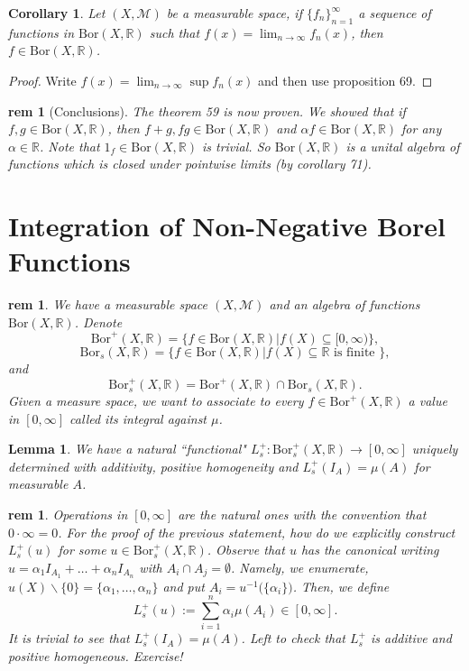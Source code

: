 \documentclass[letterpaper, 12pt]{article}
\newcommand{\fin}{\qquad \quad \hfill \framebox[1.75mm][l]{\,}}
\newcommand{\cM}{\mathcal{M}}
\newcommand{\bR}{\mathbb{R}}
\theoremstyle{stdthm}
\newtheorem{lem}[thm]{Lemma}
\newtheorem{cor}[thm]{Corollary}
\theoremstyle{stddef}
\newtheorem{rem}[thm]{rem} %
\theoremstyle{stdnonum}
\theoremstyle{stdqands}
\theoremstyle{stdbold}
\begin{document}
\begin{cor}
Let $(X,\cM)$ be a measurable space, if $\{f_n\}_{n=1}^\infty$ a sequence of functions in $\mathrm{Bor}(X,\bR)$ such that $f(x) = \lim_{n\rightarrow \infty} f_n(x)$, then $f \in \mathrm{Bor}(X,\bR)$.  
\end{cor}

\begin{proof}
Write $f(x) = \lim_{n\rightarrow \infty} \sup f_n(x)$ and then use proposition 69.  
\end{proof}

\begin{rem} [Conclusions]
The theorem 59 is now proven. We showed that if $f,g \in \mathrm{Bor}(X,\bR)$, then $f+g, fg \in \mathrm{Bor}(X,\bR)$ and $\alpha f  \in \mathrm{Bor}(X,\bR)$ for any $\alpha\in\bR$. Note that $1_f \in \mathrm{Bor}(X,\bR)$ is trivial. So $\mathrm{Bor}(X,\bR)$ is a unital algebra of functions which is closed under pointwise limits (by corollary 71). 
\end{rem}

\newpage

\section{Integration of Non-Negative Borel Functions}

\begin{rem}
We have a measurable space $(X,\cM)$ and an algebra of functions $\mathrm{Bor}(X,\bR)$. Denote 
\[
\mathrm{Bor}^+(X,\bR) = \{ f \in \mathrm{Bor}(X,\bR)|f(X) \subseteq [0,\infty)\},
\]
\[
\mathrm{Bor}_s(X,\bR) = \{f \in \mathrm{Bor}(X,\bR)| f(X) \subseteq \bR \text{ is finite }\},
\]
and 
\[
\mathrm{Bor}_s^+ (X,\bR) = \mathrm{Bor}^+ (X,\bR) \cap \mathrm{Bor}_s(X,\bR).
\]
Given a measure space, we want to associate to every $f \in \mathrm{Bor}^+(X,\bR)$ a value in $[0,\infty]$ called its integral against $\mu$.  
\end{rem}

\begin{lem}
We have a natural ``functional" $L_s^+: \mathrm{Bor}_s^+ (X,\bR) \rightarrow [0,\infty]$ uniquely determined with additivity, positive homogeneity and $L_s^+(I_A) = \mu(A)$ for measurable $A$. 
\end{lem}

\begin{rem}
Operations in $[0,\infty]$ are the natural ones with the convention that $0\cdot \infty = 0 $. For the proof of the previous statement, how do we explicitly  construct $L_s^+(u)$ for some $u \in \mathrm{Bor}_s^+(X,\bR)$. Observe that $u$ has the canonical writing $u = \alpha_1 I_{A_1} + \dots + \alpha_n I_{A_n}$ with $A_i \cap A_j = \emptyset$.  Namely, we enumerate, $u(X) \backslash \{0\} = \{\alpha_1, \dots, \alpha_n\}$ and put $A_i = u^{-1} \big(\{\alpha_i\}\big)$. Then, we define 
\[
L_s^+(u) := \sum_{i=1}^n \alpha_i \mu(A_i) \in [0, \infty].
\]
It is trivial to see that $L_s^+(I_A) = \mu(A)$. Left to check that $L_s^+$ is additive and positive homogeneous. Exercise!  
\end{rem}
\end{document}
